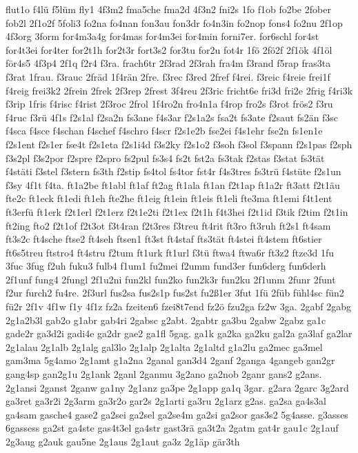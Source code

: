 {flut1o
f4lü
f5lüm
fly1
4f3m2
fma5che
fma2d
4f3n2
fni2s
1fo
f1ob
fo2be
2fober
fob2l
2f1o2f
5foli3
fo2na
fo4nan
fon3au
fon3dr
fo4n3in
fo2nop
fons4
fo2nu
2f1op
4f3org
3form
for4m3a4g
for4mas
for4m3ei
for4min
forni7er.
for6schl
for4st
for4t3ei
for4ter
for2t1h
for2t3r
fort3s2
for3tu
for2u
fot4r
1fö
2fö2f
2f1ök
4f1öl
för4s5
4f3p4
2f1q
f2r4
f3ra.
frach6tr
2f3rad
2f3rah
fra4m
f3rand
f5rap
fras3ta
f3rat
1frau.
f3rauc
2fräd
1f4rän
2fre.
f3rec
f3red
2fref
f4rei.
f3reic
f4reie
frei1f
f4reig
frei3k2
2frein
2frek
2f3rep
2frest
3f4reu
2f3ric
fricht6e
fri3d
fri2e
2frig
f4ri3k
f3rip
1fris
f4risc
f4rist
2f3roc
2frol
1f4ro2n
fro4n1a
f4rop
fro2s
f3rot
frös2
f3ru
f4ruc
f3rü
4f1s
f2s1al
f2sa2n
fs3ane
f4s3ar
f2s1a2s
fsa2t
fs3ate
f2saut
fs2än
f3sc
f4sca
f4sce
f4schan
f4schef
f4schro
f4scr
f2s1e2b
fse2ei
f4s1ehr
fse2n
fs1en1e
f2s1ent
f2s1er
fse4t
f2s1eta
f2s1i4d
f3s2ky
f2s1o2
f3soh
f3sol
f3spann
f2s1pas
f2sph
f3s2pl
f3s2por
f2spre
f2spro
fs2pul
fs3s4
fs2t
fst2a
fs3tak
f2stas
f3stat
fs3tät
f4stäti
f3stel
f3stern
fs3th
f2stip
fs4tol
fs4tor
fst4r
f4s3tres
fs3trü
f4stüte
f2s1un
f3sy
4f1t
f4ta.
ft1a2be
ft1abl
ft1af
ft2ag
ft1ala
ft1an
f2t1ap
ft1a2r
ft3att
f2t1äu
fte2c
ft1eck
ft1edi
ft1eh
fte2he
ft1eig
ft1ein
ft1eis
ft1eli
fte3ma
ft1emi
f4t1ent
ft3erfü
ft1erk
f2t1erl
f2t1erz
f2t1e2ti
f2t1ex
f2t1h
f4t3hei
f2t1id
f3tik
f2tim
f2t1in
ft2ing
fto2
f2t1of
f2t3ot
f3t4ran
f2t3res
f3treu
ft4rit
ft3ro
ft3ruh
ft2s1
ft4sam
ft3s2c
ft4sche
ftse2
ft4seh
ftsen1
ft3st
ft4staf
fts3tät
ft4stei
ft4stem
ft6stier
ft6s5treu
ftstro4
ft4stru
f2tum
ft1urk
ft1url
f3tü
ftwa4
ftwa6r
ft3z2
ftze3d
1fu
3fuc
3fug
f2uh
fuku3
fulb4
f1um1
fu2mei
f2umm
fund3er
fun6derg
fun6derh
2f1unf
fung4
2fungl
2f1u2ni
fun2kl
fun2ko
fun2k3r
fun2ku
2f1unm
2funr
2funt
f2ur
furch2
fu4re.
2f3url
fus2sa
fus2s1p
fus2st
fu2ß1er
3fut
1fü
2füb
fühl4sc
fün2
fü2r
2f1v
4f1w
f1y
4f1z
fz2a
fzeiten6
fzei8t7end
fz2ö
fzu2ga
fz2w
3ga.
2gabf
2gabg
2g1a2b3l
gab2o
g1abr
gab4ri
2gabsc
g2abt.
2gabtr
ga3bu
2gabw
2gabz
ga1c
gade2r
ga3d2i
gadi4e
ga2dr
gae2
ga1fl
5gag.
ga1k
ga2ka
ga2ku
gal2a
ga3laf
ga2lar
2g1alau
2g1alb
2g1alg
gal3lo
2g1alp
2g1alta
2g1altd
g1a2lu
ga2mec
ga3mel
gam3ma
5g4amo
2g1amt
g1a2na
2ganal
gan3d4
2ganf
2ganga
4gangeb
gan2gr
gang4sp
gan2g1u
2g1ank
2ganl
2ganmu
3g2ano
ga2nob
2ganr
gans2
g2ans.
2g1ansi
2ganst
2ganw
ga1ny
2g1anz
ga3pe
2g1app
ga1q
3gar.
g2ara
2garc
3g2ard
ga3ret
ga3r2i
2g3arm
ga3r2o
gar2s
2g1arti
ga3ru
2g1arz
g2as.
ga2sa
ga4s3al
ga4sam
gasche4
gase2
ga2sei
ga2sel
ga2se4m
ga2si
ga2sor
gas3s2
5g4asse.
g3asses
6gassess
ga2st
ga4ste
gas4t3el
ga4str
gast3rä
ga3t2a
2gatm
gat4r
gau1c
2g1auf
2g3aug
g2auk
gau5ne
2g1aus
2g1aut
ga3z
2g1äp
gär3th
}
